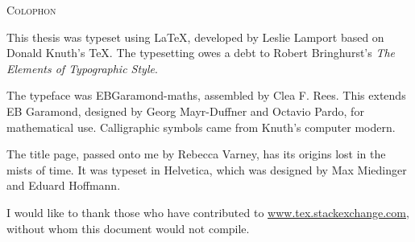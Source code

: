 {
  \thispagestyle{empty}
  \setlength{\parskip}{12pt}
  \setlength{\parindent}{0pt}

  \vspace*{\fill}
  \textsc{Colophon}

  This thesis was typeset using \LaTeX{}, developed by Leslie Lamport based on Donald Knuth's \TeX{}.
  The typesetting owes a debt to Robert Bringhurst's \emph{The Elements of Typographic Style}.

  The typeface was EBGaramond-maths, assembled by Clea F. Rees. This extends EB Garamond,
  designed by Georg Mayr-Duffner and Octavio Pardo, for mathematical use. Calligraphic
  symbols came from Knuth's computer modern.

  The title page, passed onto me by Rebecca Varney, has its origins lost in the mists of time. It was typeset in Helvetica,
  which was designed by Max Miedinger and Eduard Hoffmann.

  I would like to thank those who have contributed to \url{www.tex.stackexchange.com}, without whom this document would not compile.
  
  \vspace*{\fill}
}